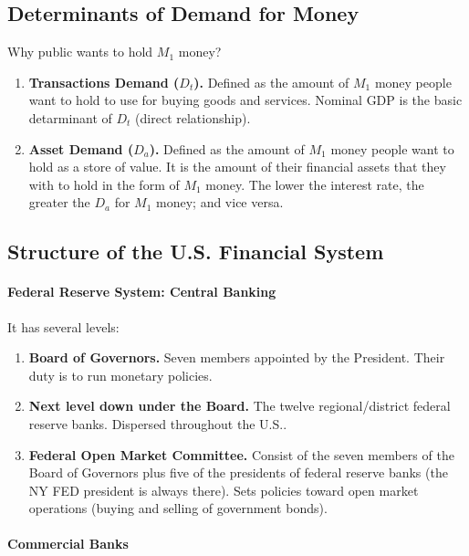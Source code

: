 \subsection{Determinants of Demand for Money}

Why public wants to hold $M_1$ money?

\begin{enumerate}[label = \textbullet] 
	\item \textbf{Transactions Demand ($D_t$).} Defined as the amount of $M_1$ money people want to hold to use for buying goods and services.
		Nominal GDP is the basic detarminant of $D_t$ (direct relationship).
	\item \textbf{Asset Demand ($D_a$).} Defined as the amount of $M_1$ money people want to hold as a store of value.
		It is the amount of their financial assets that they with to hold in the form of $M_1$ money.
		The lower the interest rate, the greater the $D_a$ for $M_1$ money; and vice versa. 
\end{enumerate}

\subsection{Structure of the U.S. Financial System}

\paragraph{Federal Reserve System: Central Banking} It has several levels:
\begin{enumerate}[label = \textbullet]
	\item \textbf{Board of Governors.} Seven members appointed by the President. Their duty is to run monetary policies.
	\item \textbf{Next level down under the Board.} The twelve regional/district federal reserve banks. Dispersed throughout the U.S..
	\item \textbf{Federal Open Market Committee.} Consist of the seven members of the Board of Governors plus five of the presidents of federal reserve banks (the NY FED president is always there). Sets policies toward open market operations (buying and selling of government bonds). 
\end{enumerate}

\paragraph{Commercial Banks}


